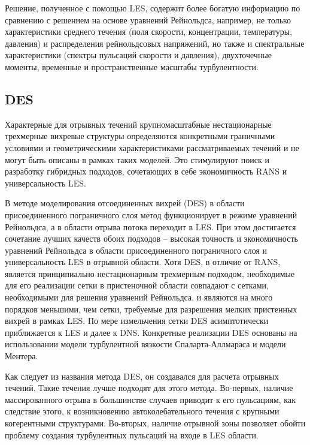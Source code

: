 	Решение, полученное с помощью LES, содержит более богатую информацию по сравнению с решением на основе уравнений Рейнольдса, например, не только характеристики среднего течения (поля скорости, концентрации, температуры, давления) и распределения рейнольдсовых напряжений, но также и спектральные характеристики (спектры пульсаций скорости и давления), двухточечные моменты, временные и пространственные масштабы турбулентности.

\subsection{DES}
	
	Характерные для отрывных течений крупномасштабные нестационарные трехмерные вихревые структуры определяются конкретными граничными условиями и геометрическими характеристиками рассматриваемых течений и не могут быть описаны в рамках таких моделей. Это стимулируют поиск и разработку гибридных подходов, сочетающих в себе экономичность RANS и универсальность LES.
	
	В методе моделирования отсоединенных вихрей (DES) в области присоединенного пограничного слоя метод функционирует в режиме уравнений Рейнольдса, а в области отрыва потока переходит в LES. При этом достигается сочетание лучших качеств обоих подходов -- высокая точность и экономичность уравнений Рейнольдса в области присоединенного пограничного слоя и универсальность LES в отрывной области. Хотя DES, в отличие от RANS, является принципиально нестационарным трехмерным подходом, необходимые для его реализации сетки в пристеночной области совпадают с сетками, необходимыми для решения уравнений Рейнольдса, и являются на много порядков меньшими, чем сетки, требуемые для разрешения мелких пристенных вихрей в рамках LES. По мере измельчения сетки DES асимптотически приближается к LES и далее к DNS. Конкретные реализации DES основаны на использовании модели турбулентной вязкости Спаларта-Аллмараса и модели Ментера\cite{Strelets2001}.
	
	Как следует из названия метода DES, он создавался для расчета отрывных течений. Такие течения лучше подходят для этого метода. Во-первых, наличие массированного отрыва в большинстве случаев приводит к его пульсациям, как следствие этого, к возникновению автоколебательного течения с крупными когерентными структурами. Во-вторых, наличие отрывной зоны позволяет обойти проблему создания турбулентных пульсаций на входе в LES области.
	
